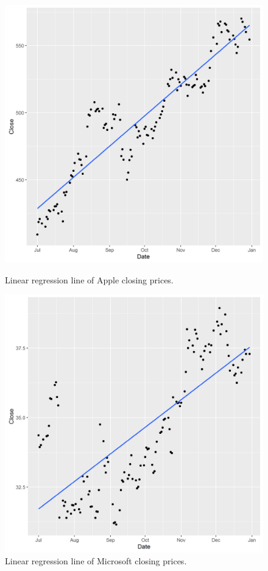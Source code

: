 \documentclass[paper=a4, fontsize=11pt]{scrartcl} %
\numberwithin{equation}{section} %
\numberwithin{figure}{section} %
\numberwithin{table}{section} %
\begin{document}
\begin{figure}[!htb]
  \includegraphics[width=\linewidth]{graph/a_reg6.png}
  \caption{Linear regression line of Apple closing prices.}
\endminipage\hfill
{}
  \includegraphics[width=\linewidth]{graph/m_reg6.png}
  \caption{Linear regression line of Microsoft closing prices.}
\endminipage\hfill
\end{figure}
\end{document}
